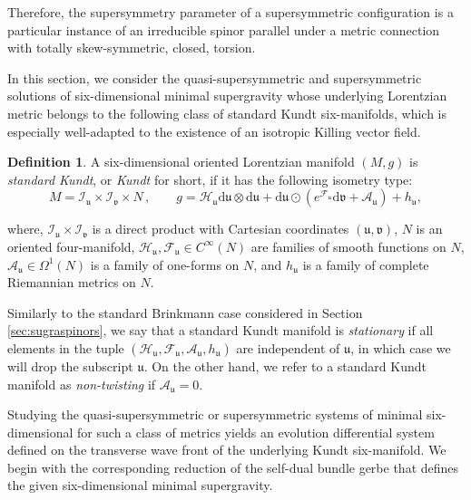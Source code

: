 \documentclass[10pt,a4paper,twoside,reqno]{amsart}
\theoremstyle{plain}
\theoremstyle{definition}
\newtheorem{definition}[thm]{Definition}
\theoremstyle{remark}
\def\dd{\mathrm{d}}
\def\cH{\mathcal{H}}
\def\cA{\mathcal{A}}
\def\cF{\mathcal{F}}
\def\cH{\mathcal{H}}
\def\dd{\mathrm{d}}
\def\fru{\mathfrak{u}}
\begin{document}
\noindent
Therefore, the supersymmetry parameter of a supersymmetric configuration is a particular instance of an irreducible spinor parallel under a metric connection with totally skew-symmetric, closed, torsion.\medskip

In this section, we consider the quasi-supersymmetric and supersymmetric solutions of six-dimensional minimal supergravity whose underlying Lorentzian metric belongs to the following class of standard Kundt six-manifolds, which is especially well-adapted to the existence of an isotropic Killing vector field.

\begin{definition}
\label{def:standardKundt}
A six-dimensional oriented Lorentzian manifold $(M,g)$ is \emph{standard Kundt}, or \emph{Kundt} for short, if it has the following isometry type:
\begin{equation}
\label{eq:standardKundt}
M = \mathcal{I}_{\mathfrak{u}}\times \mathcal{I}_{\mathfrak{v}}\times N\, , \qquad g = \cH_{\mathfrak{u}} \dd \mathfrak{u} \otimes \dd \mathfrak{u} +  \dd \mathfrak{u} \odot (e^{\cF_{\mathfrak{u}}}\dd \mathfrak{v} + \cA_{\mathfrak{u}}) + h_{\mathfrak{u}},
\end{equation}

\noindent
where, $\mathcal{I}_{\mathfrak{u}}\times \mathcal{I}_{\mathfrak{v}}$ is a direct product with Cartesian coordinates $(\mathfrak{u},\mathfrak{v})$, $N$ is an oriented four-manifold, $\cH_{\mathfrak{u}}, \cF_{\mathfrak{u}} \in C^{\infty}(N)$ are families of smooth functions on $N$, $\cA_{\mathfrak{u}} \in \Omega^1(N)$ is a family of one-forms on $N$, and $h_{\mathfrak{u}}$ is a family of complete Riemannian metrics on $N$. 
\end{definition}

\noindent
Similarly to the standard Brinkmann case considered in Section \ref{sec:sugraspinors}, we say that a standard Kundt manifold is \emph{stationary} if all elements in the tuple $(\cH_{\mathfrak{u}}, \cF_{\mathfrak{u}} , \cA_{\fru} , h_{\fru} )$ are independent of $\fru$, in which case we will drop the subscript $\fru$. On the other hand, we refer to a standard Kundt manifold as \emph{non-twisting} if $\cA_{\fru}=0$.\medskip

\noindent
Studying the quasi-supersymmetric or supersymmetric systems of minimal six-dimensional for such a class of metrics yields an evolution differential system defined on the transverse wave front of the underlying Kundt six-manifold. We begin with the corresponding reduction of the self-dual bundle gerbe that defines the given six-dimensional minimal supergravity. 
\end{document}
